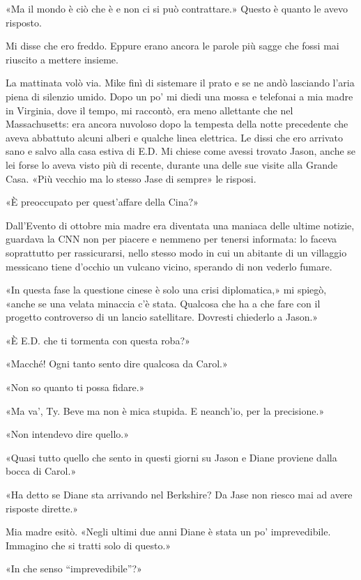 «Ma il mondo è ciò che è e non ci si può contrattare.» Questo è quanto
le avevo risposto.

Mi disse che ero freddo. Eppure erano ancora le parole più sagge che
fossi mai riuscito a mettere insieme.

\separatorefiori

La mattinata volò via. Mike finì di sistemare il prato e se ne andò
lasciando l'aria piena di silenzio umido. Dopo un po' mi diedi una mossa
e telefonai a mia madre in Virginia, dove il tempo, mi raccontò, era
meno allettante che nel Massachusetts: era ancora nuvoloso dopo la
tempesta della notte precedente che aveva abbattuto alcuni alberi e
qualche linea elettrica. Le dissi che ero arrivato sano e salvo alla
casa estiva di E.D. Mi chiese come avessi trovato Jason, anche se lei
forse lo aveva visto più di recente, durante una delle sue visite alla
Grande Casa. «Più vecchio ma lo stesso Jase di sempre» le risposi.

«È preoccupato per quest'affare della Cina?»

Dall'Evento di ottobre mia madre era diventata una maniaca delle ultime
notizie, guardava la CNN non per piacere e nemmeno per tenersi
informata: lo faceva soprattutto per rassicurarsi, nello stesso modo in
cui un abitante di un villaggio messicano tiene d'occhio un vulcano
vicino, sperando di non vederlo fumare.

«In questa fase la questione cinese è solo una crisi diplomatica,» mi
spiegò, «anche se una velata minaccia c'è stata. Qualcosa che ha a che
fare con il progetto controverso di un lancio satellitare. Dovresti
chiederlo a Jason.»

«È E.D. che ti tormenta con questa roba?»

«Macché! Ogni tanto sento dire qualcosa da Carol.»

«Non so quanto ti possa fidare.»

«Ma va', Ty. Beve ma non è mica stupida. E neanch'io, per la
precisione.»

«Non intendevo dire quello.»

«Quasi tutto quello che sento in questi giorni su Jason e Diane proviene
dalla bocca di Carol.»

«Ha detto se Diane sta arrivando nel Berkshire? Da Jase non riesco mai
ad avere risposte dirette.»

Mia madre esitò. «Negli ultimi due anni Diane è stata un po'
imprevedibile. Immagino che si tratti solo di questo.»

«In che senso ``imprevedibile''?»

